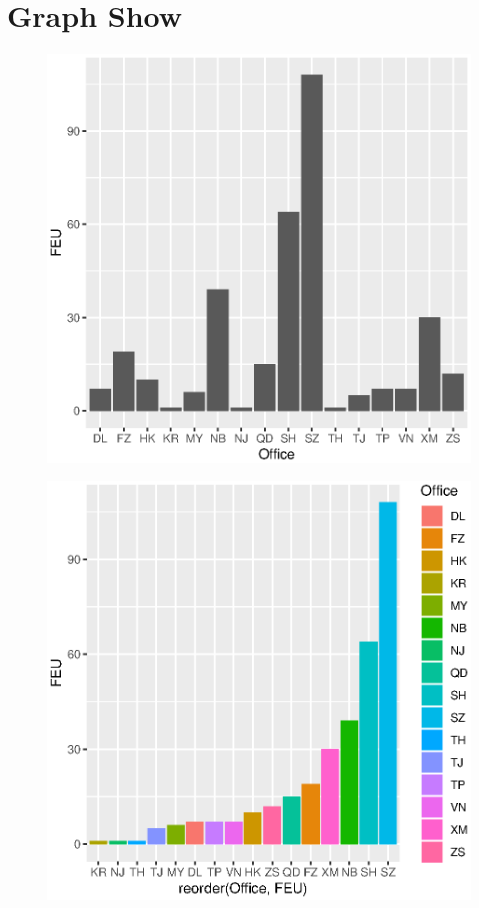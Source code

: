 \documentclass[a4paper]{article}
\begin{document}
	\section*{Graph Show}
		\begin{figure}
		\begin{center}
		\includegraphics{Rplot01}
		\end{center}
		\end{figure}
		\begin{figure}
		\begin{center}
		\includegraphics{Rplot03}
		\end{center}
		\end{figure}
\end{document}
